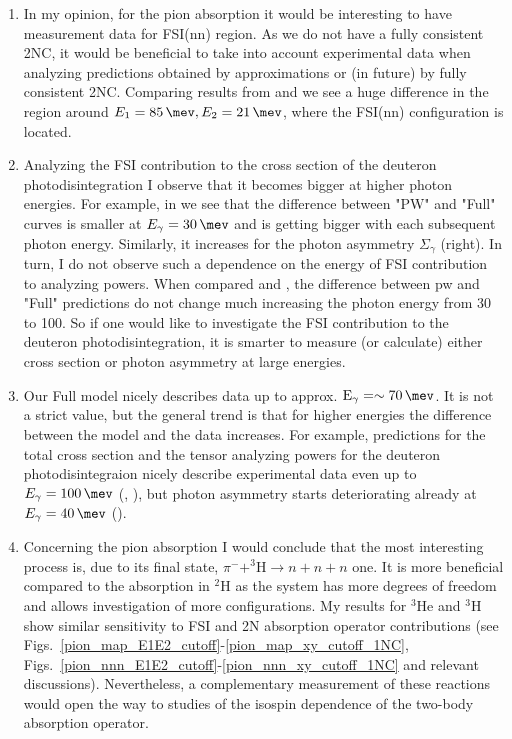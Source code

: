\begin{enumerate}
    \item In my opinion, for the pion absorption it would be interesting to have measurement data for FSI(nn) region. As we do not have a fully consistent 2NC, it would be beneficial to take into account experimental data when analyzing predictions obtained by approximations or (in future) by fully consistent 2NC. Comparing results from   and  we see a huge difference in the region around $E_1=\SI{85}{\mev}, E_2 = \SI{21}{\mev}$, where the FSI(nn) configuration is located.
    \item Analyzing the FSI contribution to the cross section of the deuteron photodisintegration 
    I observe that it becomes bigger at higher photon energies.
    For example, in  we see that the difference between "PW" and "Full" curves
    is smaller at $E_\gamma = \SI{30}{\mev}$ and is getting bigger with each subsequent photon energy. 
    Similarly, it increases for the photon asymmetry $\Sigma_\gamma$ (right).
    In turn, I do not observe such a dependence on the energy of FSI contribution to analyzing powers.
    When compared  and , the difference between \gls{pw} and "Full"
    predictions do not change much increasing the photon energy from \SI{30}{\mev} to \SI{100}{\mev}.
    So if one would like to investigate the FSI contribution to the deuteron photodisintegration,
    it is smarter to measure (or calculate) either cross section or photon asymmetry at large energies.
    \item Our Full model nicely describes data up to approx. $\text{E}_\gamma = \sim\SI{70}{\mev}$. It is not a strict value, but the general trend is that for higher energies the difference between the model and the data increases.
    For example, predictions for the total cross section and the tensor analyzing powers for the deuteron photodisintegraion nicely describe experimental data even up to $E_\gamma = \SI{100}{\mev}$ (, ), but photon asymmetry starts deteriorating already at $E_\gamma = \SI{40}{\mev}$ ().
    \item Concerning the pion absorption I would conclude that the most interesting process is, due to its final state, 
    $\pi^- + ^3\text{H} \rightarrow n + n + n$ one.
    It is more beneficial compared to the absorption in $^2$H as the system has more degrees of freedom and allows
    investigation of more configurations.
    My results for $^3$He and $^3$H show similar sensitivity to FSI and 2N absorption operator contributions
    (see Figs.~\ref{pion_map_E1E2_cutoff}-\ref{pion_map_xy_cutoff_1NC}, Figs.~\ref{pion_nnn_E1E2_cutoff}-\ref{pion_nnn_xy_cutoff_1NC}
    and relevant discussions).
    Nevertheless, a complementary measurement of these reactions would open the way to studies of the isospin dependence of the two-body absorption operator.
\end{enumerate}

